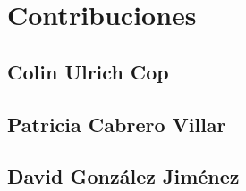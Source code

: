 \chapter{Contribuciones}
\section{Colin Ulrich Cop}
\section{Patricia Cabrero Villar}
\section{David González Jiménez
}
\noindent
